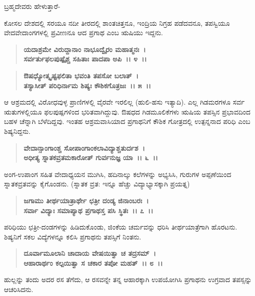 \begin{flushleft}
ಬ್ರಹ್ಮದೇವರು ಹೇಳುತ್ತಾರೆ-
\end{flushleft}

ಕೋಸಲ ದೇಶದಲ್ಲಿ ಸರಯೂ ನದೀ ತೀರದಲ್ಲಿ ಶಾಂತಚಿತ್ತನೂ, ಇಂದ್ರಿಯ ನಿಗ್ರಹ ಪಡೆದವನೂ, ತಪಸ್ವಿಯೂ ವೇದವೇದಾಂಗಗಳಲ್ಲಿ ಪ್ರವೀಣನೂ ಆದ ಪ್ರಗಾಥ ಎಂಬ ಋಷಿಯು ಇದ್ದನು.

\begin{verse}
\textbf{ಯದಾಶ್ರಮೇ ವಿರುದ್ದಾನಾಂ ನಾಭೂದ್ವೈರಂ ಮಹಾತ್ಮನಃ~।}\\\textbf{ಸರ್ವರ್ತುಫಲಪುಷ್ಪೈಶ್ಚ ಸಹಿತಾಃ ಪಾದಪಾ ಅಪಿ~।। ೪~।। }
\end{verse}

\begin{verse}
\textbf{ಔಷಧ್ಯೋತ್ಕೃಷ್ಟಫಲಿತಾ ಭವಂತಿ ತಪಸೋ ಬಲಾತ್~।}\\\textbf{ತಸ್ಯಾಸೀತ್ ಪರಿಧಿರ್ನಾಮ ಶಿಷ್ಯಃ ಕೌಶಿಕಗೊತ್ರಜಃ~।। ೫~।।}
\end{verse}

ಆ ಆಶ್ರಮದಲ್ಲಿ ವಿರೋಧವುಳ್ಳ ಪ್ರಾಣಿಗಳಲ್ಲಿ ವೈರವೇ ಇರಲಿಲ್ಲ (ಹುಲಿ-ಹಸು ಇತ್ಯಾದಿ). ಎಲ್ಲ ಗಿಡಮರಗಳೂ ಸರ್ವ ಋತುಗಳಲ್ಲಿಯೂ ಫಲಪುಷ್ಪಗಳಿಂದ ಭರಿತವಾಗಿದ್ದುವು. ಔಷಧದ ಗಿಡಮೂಲಿಕೆಗಳು ಋಷಿಯ ತಪಸ್ಸಿನ ಪ್ರಭಾವದಿಂದ ಬಹಳ ಚೆನ್ನಾಗಿ ಬೆಳೆದಿದ್ದವು. ಇಂತಹ ಆಶ್ರಮವಾಸಿಯಾದ ಪ್ರಗಾಥನಿಗೆ ಕೌಶಿಕ ಗೋತ್ರದಲ್ಲಿ ಉತ್ಪನ್ನನಾದ ಪರಿಧಿ ಎಂಬ ಶಿಷ್ಯನಿದ್ದನು.

\begin{verse}
\textbf{ವೇದಾನ್ಸಾಂಗಾಂಶ್ಚ ಸೋಪಾಂಗಾಂಕಲಾವಿದ್ಯಾಶ್ಚತುರ್ದಶ~।}\\\textbf{ಅಧೀತ್ಯ ಸ್ನಾತಕವ್ರತಮಕಾರೋತ್ ಗುರ್ವನುಜ್ಞ ಯಾ~।। ೬~।।}
\end{verse}

ಅಂಗ-ಉಪಾಂಗ ಸಹಿತ ವೇದಾಧ್ಯಯನ ಮುಗಿಸಿ, ಹದಿನಾಲ್ಕು ಕಲೆಗಳನ್ನು ಅಭ್ಯಸಿಸಿ, ಗುರುಗಳ ಅಪ್ಪಣೆಯಿಂದ ಸ್ನಾತಕವ್ರತವನ್ನು ಕೈಗೊಂಡನು. (ಸ್ನಾತಕ ವ್ರತ: ಇನ್ನೂ ಹೆಚ್ಚು ವಿದ್ಯಾಭ್ಯಾಸಕ್ಕಾಗಿ ಪ್ರಯತ್ನ)

\begin{verse}
\textbf{ಜಗಾಮು ತೀರ್ಥಯಾತ್ರಾರ್ಥೇ ಛತ್ರೀ ದಂಡ್ಯ ಜಿನಾಂಬರಃ~।}\\\textbf{ಸರ್ವಾ ವಿದ್ಯಾಃ ಸಮಾಪ್ಯಾಥ ಪ್ರಗಾಥಸ್ತ ಪಸಿ ಸ್ಥಿತಃ~।। ೭~।।}
\end{verse}

ಪರಿಧಿಯು ಛತ್ರೀ-ದಂಡಗಳನ್ನು ಹಿಡಿದುಕೊಂಡು, ಜಿಂಕೆಯ ಚರ್ಮವನ್ನು ಧರಿಸಿ ತೀರ್ಥಯಾತ್ರೆಗಾಗಿ ಹೊರಟನು. ಶಿಷ್ಯನಿಗೆ ಸಕಲ ವಿದ್ಯೆಗಳನ್ನೂ ಕಲಿಸಿ ಪ್ರಗಾಥನು ತಪಸ್ಸಿಗೆ ನಿಂತನು.

\begin{verse}
\textbf{ದೂರ್ವಾಮೂಲಾನಿ ಚಾದಾಯ ವೇಷಯಿತ್ವಾ ಚ ತದ್ರಸಮ್~।}\\\textbf{ಆಹಾರಾರ್ಥಂ ಕಲ್ಪಯಿತ್ವಾ ಸ ಚಕಾರ ತಪೋ ಮಹತ್~।। ೮~।।}
\end{verse}

ಹುಲ್ಲನ್ನು ತಂದು ಅದರ ರಸ ತೆಗೆದು, ಆ ರಸವನ್ನೇ ತನ್ನ ಆಹಾರಕ್ಕಾಗಿ ಉಪಯೋಗಿಸಿ ಪ್ರಗಾಥನು ಉಗ್ರವಾದ ತಪಸ್ಸನ್ನು ಆಚರಿಸಿದನು.

